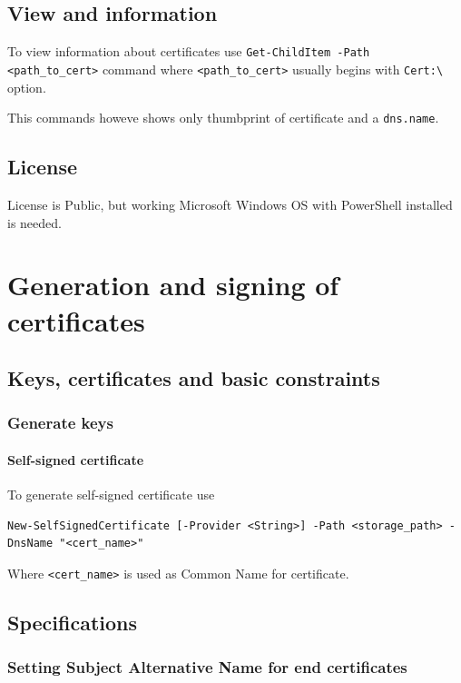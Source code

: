 \documentclass[10pt, a4paper]{report}
\begin{document}
  \subsection{View and information}
To view information about certificates use \verb+Get-ChildItem -Path <path_to_cert>+ command where \verb+<path_to_cert>+ usually begins with \verb+Cert:\+ option.

This commands howeve shows only thumbprint of certificate and a \verb+dns.name+. 
  \subsection{License}
License is Public, but working Microsoft Windows OS with PowerShell installed is needed.
  
\section{Generation and signing of certificates}

  \subsection{Keys, certificates and basic constraints}
  
    \subsubsection{Generate keys}
    
      \paragraph{Self-signed certificate}
To generate self-signed certificate use 
\begin{verbatim}
New-SelfSignedCertificate [-Provider <String>] -Path <storage_path> -DnsName "<cert_name>" 
\end{verbatim}

Where \verb+<cert_name>+ is used as Common Name for certificate. 

  \subsection{Specifications}
  
    \subsubsection{Setting Subject Alternative Name for end certificates}
\end{document}
